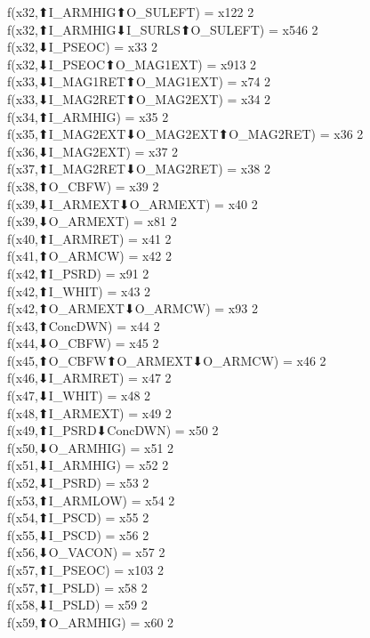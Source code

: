 f(x32,⬆I_ARMHIG⬆O_SULEFT) = x122 {2} \\
f(x32,⬆I_ARMHIG⬇I_SURLS⬆O_SULEFT) = x546 {2} \\
f(x32,⬇I_PSEOC) = x33 {2} \\
f(x32,⬇I_PSEOC⬆O_MAG1EXT) = x913 {2} \\
f(x33,⬇I_MAG1RET⬆O_MAG1EXT) = x74 {2} \\
f(x33,⬇I_MAG2RET⬆O_MAG2EXT) = x34 {2} \\
f(x34,⬆I_ARMHIG) = x35 {2} \\
f(x35,⬆I_MAG2EXT⬇O_MAG2EXT⬆O_MAG2RET) = x36 {2} \\
f(x36,⬇I_MAG2EXT) = x37 {2} \\
f(x37,⬆I_MAG2RET⬇O_MAG2RET) = x38 {2} \\
f(x38,⬆O_CBFW) = x39 {2} \\
f(x39,⬇I_ARMEXT⬇O_ARMEXT) = x40 {2} \\
f(x39,⬇O_ARMEXT) = x81 {2} \\
f(x40,⬆I_ARMRET) = x41 {2} \\
f(x41,⬆O_ARMCW) = x42 {2} \\
f(x42,⬆I_PSRD) = x91 {2} \\
f(x42,⬆I_WHIT) = x43 {2} \\
f(x42,⬆O_ARMEXT⬇O_ARMCW) = x93 {2} \\
f(x43,⬆ConcDWN) = x44 {2} \\
f(x44,⬇O_CBFW) = x45 {2} \\
f(x45,⬆O_CBFW⬆O_ARMEXT⬇O_ARMCW) = x46 {2} \\
f(x46,⬇I_ARMRET) = x47 {2} \\
f(x47,⬇I_WHIT) = x48 {2} \\
f(x48,⬆I_ARMEXT) = x49 {2} \\
f(x49,⬆I_PSRD⬇ConcDWN) = x50 {2} \\
f(x50,⬇O_ARMHIG) = x51 {2} \\
f(x51,⬇I_ARMHIG) = x52 {2} \\
f(x52,⬇I_PSRD) = x53 {2} \\
f(x53,⬆I_ARMLOW) = x54 {2} \\
f(x54,⬆I_PSCD) = x55 {2} \\
f(x55,⬇I_PSCD) = x56 {2} \\
f(x56,⬇O_VACON) = x57 {2} \\
f(x57,⬆I_PSEOC) = x103 {2} \\
f(x57,⬆I_PSLD) = x58 {2} \\
f(x58,⬇I_PSLD) = x59 {2} \\
f(x59,⬆O_ARMHIG) = x60 {2} \\
